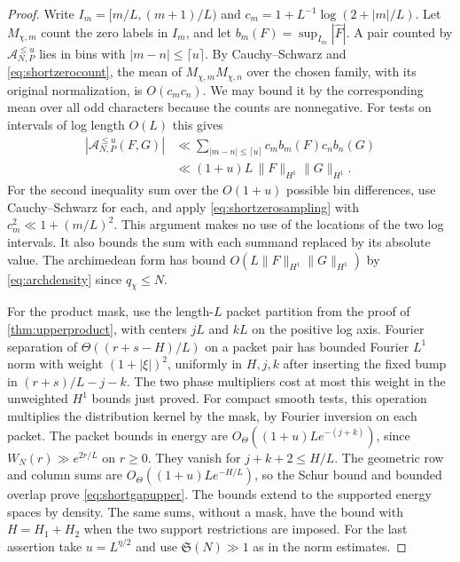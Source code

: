 \documentclass[11pt,a4paper]{article}
\numberwithin{equation}{section}
\newcommand{\SSS}{\mathfrak S}
\begin{document}
\begin{proof}
Write $I_m=[m/L,(m+1)/L)$ and
$c_m=1+L^{-1}\log(2+|m|/L)$. Let $M_{\chi,m}$ count
the zero labels in $I_m$, and let $b_m(F)=\sup_{I_m}|\widehat F|$.
A pair counted by $\mathcal A_{N,P}^{\le u}$ lies in bins
with $|m-n|\le\lceil u\rceil$. By Cauchy--Schwarz and
\cref{eq:shortzerocount}, the mean of $M_{\chi,m}M_{\chi,n}$
over the chosen family, with its original normalization,
is $O(c_m c_n)$. We may bound it by the corresponding
mean over all odd characters because the counts are nonnegative.
For tests on intervals of log length $O(L)$ this gives
\begin{align*}
 |\mathcal A_{N,P}^{\le u}(F,G)|
   &\ll \sum_{|m-n|\le\lceil u\rceil}
          c_m b_m(F)c_n b_n(G)\\
   &\ll (1+u)L\,\|F\|_{H^1}\|G\|_{H^1}.
\end{align*}
For the second inequality sum over the $O(1+u)$ possible
bin differences, use Cauchy--Schwarz for each, and apply
\cref{eq:shortzerosampling} with
$c_m^2\ll1+(m/L)^2$. This argument makes no use of the
locations of the two log intervals. It also bounds the
sum with each summand replaced by its absolute value.
The archimedean form has bound $O(L\|F\|_{H^1}\|G\|_{H^1})$
by \cref{eq:archdensity} since $q_\chi\le N$.

For the product mask, use the length-$L$ packet partition
from the proof of \cref{thm:upperproduct}, with centers $jL$
and $kL$ on the positive log axis. Fourier separation of
$\Theta((r+s-H)/L)$ on a packet pair has bounded Fourier
$L^1$ norm with weight $(1+|\xi|)^2$, uniformly in $H,j,k$
after inserting the fixed bump in $(r+s)/L-j-k$.
The two phase multipliers cost at most this weight in the
unweighted $H^1$ bounds just proved. For compact smooth tests,
this operation multiplies the distribution kernel by the
mask, by Fourier inversion on each packet. The packet
bounds in energy are
$O_\Theta((1+u)L e^{-(j+k)})$, since
$W_N(r)\gg e^{2r/L}$ on $r\ge0$. They vanish for
$j+k+2\le H/L$. The geometric row and column sums are
$O_\Theta((1+u)L e^{-H/L})$, so the Schur bound and
bounded overlap prove \cref{eq:shortgapupper}. The bounds
extend to the supported energy spaces by density. The
same sums, without a mask, have the bound with $H=H_1+H_2$
when the two support restrictions are imposed.
For the last assertion take $u=L^{\eta/2}$ and use
$\SSS(N)\gg1$ as in the norm estimates.
\end{proof}
\end{document}
